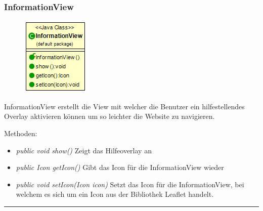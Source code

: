 \subsubsection{InformationView}
\begin{minipage}{0.3\textwidth}
    \begin{figure}[H]
        {\centering\includegraphics[scale = 0.7
        ]{media/view/view/InformationView_Class.png}}
    \end{figure}
    \end{minipage} \hfill
    \begin{minipage}{0.6\textwidth}
InformationView erstellt die View mit welcher die Benutzer ein hilfestellendes Overlay aktivieren können um so leichter 
die Website zu navigieren.
\end{minipage}
Methoden: \begin{itemize} [noitemsep]
    \item \emph{public void show()} Zeigt das Hilfeoverlay an
    \item \emph{public Icon getIcon()} Gibt das Icon für die InformationView wieder
    \item \emph{public void setIcon(Icon icon)} Setzt das Icon für die InformationView, bei welchem es sich um ein Icon aus der Bibliothek \gls{Leaflet} handelt.
\end{itemize}

\rule{\textwidth}{0.4pt}
